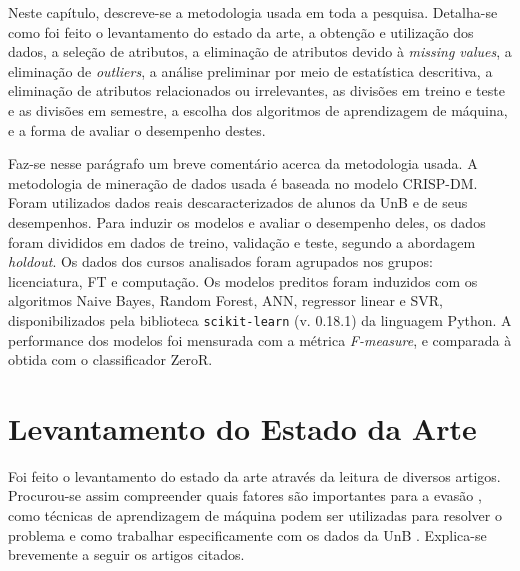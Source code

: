 Neste capítulo, descreve-se a metodologia usada em toda a pesquisa. 
Detalha-se como foi feito o levantamento
do estado da arte, a obtenção e utilização dos dados, a seleção de
atributos, a eliminação de atributos devido à \textit{missing values}, a eliminação
de \textit{outliers}, a análise preliminar por meio de estatística descritiva, a
eliminação de atributos relacionados ou irrelevantes, as divisões em treino e teste e
as divisões em semestre, a escolha dos algoritmos de aprendizagem de máquina, e a forma
de avaliar o desempenho destes.  
\par Faz-se nesse parágrafo um breve comentário acerca da metodologia usada. A
metodologia de mineração de dados usada é baseada no modelo CRISP-DM. Foram
utilizados dados reais descaracterizados de alunos da UnB e de seus desempenhos. Para
induzir os modelos e avaliar o desempenho deles, os dados foram divididos em dados de
treino, validação e teste, segundo a abordagem \textit{holdout}. Os dados dos cursos
analisados foram agrupados nos grupos: licenciatura, FT e computação. Os modelos
preditos foram induzidos com os algoritmos Naive Bayes, Random Forest, ANN, regressor
linear e SVR, disponibilizados pela biblioteca \texttt{scikit-learn} (v. 0.18.1) da linguagem
Python. A performance dos modelos foi mensurada com a métrica \textit{F-measure}, e
comparada à obtida com o classificador ZeroR. 


\section{Levantamento do Estado da Arte}
Foi feito o levantamento do estado da arte através da leitura de diversos artigos.
Procurou-se assim compreender
quais fatores são importantes para a evasão \cite{adeodato}
\cite{hoed_fatores} \cite{dropout_finland}, como técnicas de
aprendizagem de máquina podem ser utilizadas para resolver o problema \cite{adeodato}
 \cite{data_mining_retention} 
e como trabalhar especificamente com os dados da UnB \cite{manual_calouro} 
\cite{hoed_sobrevivencia}. Explica-se brevemente a seguir os artigos citados. 

